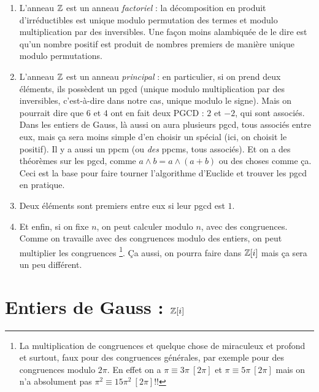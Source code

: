 \begin{enumerate}
\item L'anneau $\mathbb Z$ est un anneau \emph{factoriel} : la décomposition en produit d'irréductibles est unique modulo permutation des termes et modulo multiplication par des inversibles. Une façon moins alambiquée de le dire est qu'un nombre positif est produit  de nombres premiers de manière unique modulo permutations.
\item L'anneau $\mathbb Z$ est un anneau \emph{principal} : en particulier, si on prend deux éléments, ils possèdent un pgcd (unique modulo multiplication par des inversibles, c'est-à-dire dans notre cas, unique modulo le signe). Mais on pourrait dire que $6$ et $4$ ont en fait deux PGCD : $2$ et $-2$, qui sont associés. Dans les entiers de Gauss, là aussi on aura plusieurs pgcd, tous associés entre eux, mais ça sera moins simple d'en choisir un spécial (ici, on choisit le positif). Il y a aussi un ppcm (ou \emph{des} ppcms, tous associés). Et on a des théorèmes sur les pgcd, comme $a\wedge b = a\wedge (a+b)$ ou des choses comme ça. Ceci est la base pour faire tourner l'algorithme d'Euclide et trouver les pgcd en pratique.
\item Deux éléments sont premiers entre eux si leur pgcd est $1$.
\item Et enfin, si on fixe $n$, on peut calculer modulo $n$, avec des congruences. Comme on travaille avec des congruences modulo des entiers, on peut multiplier les congruences \footnote{La multiplication de congruences et quelque chose de miraculeux et profond et surtout, faux pour des congruences générales, par exemple pour des congruences modulo $2\pi$. En effet on a $\pi\equiv 3\pi~[2\pi]$ et $\pi\equiv 5\pi~[2\pi]$ mais on n'a absolument pas $\pi^2 \equiv 15\pi^2~[2\pi]$!!}. Ça aussi, on pourra faire dans $\mathbb Z[i]$ mais ça sera un peu différent.
\end{enumerate}


\section{Entiers de Gauss : $\mathbb Z[i]$}

